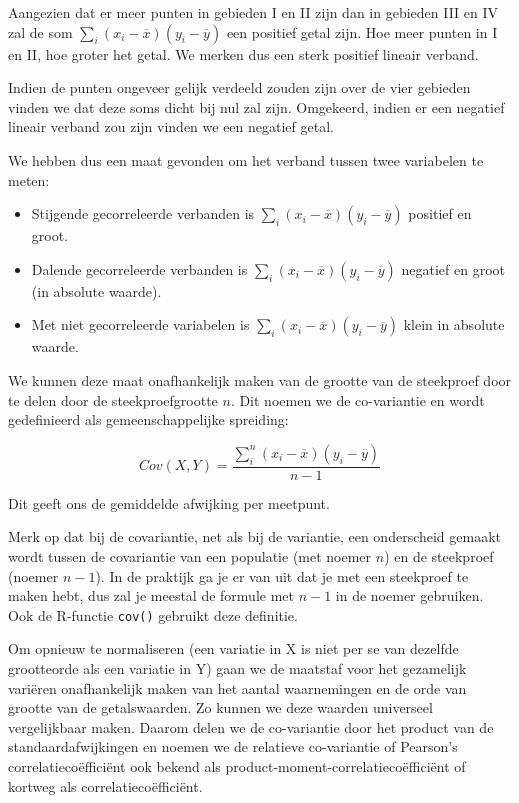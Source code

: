 Aangezien dat er meer punten in gebieden I en II zijn dan in gebieden III en IV zal de som $\sum_{i} (x_{i} - \overline{x}) (y_{i} - \overline{y})$ een positief getal zijn. Hoe meer punten in I en II, hoe groter het getal. We merken dus een sterk positief lineair verband.

Indien de punten ongeveer gelijk verdeeld zouden zijn over de vier gebieden vinden we dat deze soms dicht bij nul zal zijn. Omgekeerd, indien er een negatief lineair verband zou zijn vinden we een negatief getal.

We hebben dus een maat gevonden om het verband tussen twee variabelen te meten:

\begin{itemize}
  \item Stijgende gecorreleerde verbanden is $\sum_{i} (x_{i} - \overline{x}) (y_{i} - \overline{y})$ positief en groot.
  \item Dalende gecorreleerde verbanden is $\sum_{i} (x_{i} - \overline{x}) (y_{i} - \overline{y})$ negatief en groot (in absolute waarde).
  \item Met niet gecorreleerde variabelen is $\sum_{i} (x_{i} - \overline{x}) (y_{i} - \overline{y})$ klein in absolute waarde.
\end{itemize}

We kunnen deze maat onafhankelijk maken van de grootte van de steekproef door te delen door de steekproefgrootte $n$. Dit noemen we de co-variantie en wordt gedefinieerd als gemeenschappelijke spreiding:

\begin{equation}
  Cov(X,Y) = \frac{\sum_{i}^{n}(x_{i} - \overline{x}) (y_{i} - \overline{y})}{n - 1}
  \label{eq:covariantie}
\end{equation}

Dit geeft ons de gemiddelde afwijking per meetpunt.

Merk op dat bij de covariantie, net als bij de variantie, een onderscheid gemaakt wordt tussen de covariantie van een populatie (met noemer $n$) en de steekproef (noemer $n-1$). In de praktijk ga je er van uit dat je met een steekproef te maken hebt, dus zal je meestal de formule met $n-1$ in de noemer gebruiken. Ook de R-functie \texttt{cov()} gebruikt deze definitie.

Om opnieuw te normaliseren (een variatie in X is niet per se van dezelfde grootteorde als een variatie in Y) gaan we de maatstaf voor het gezamelijk vari\"eren onafhankelijk maken van het aantal waarnemingen en de orde van grootte van de getalswaarden. Zo kunnen we deze waarden universeel vergelijkbaar maken. Daarom delen we de co-variantie door het product van de standaardafwijkingen en noemen we de relatieve co-variantie of Pearson's correlatieco\"effici\"ent ook bekend als product-moment-correlatieco\"effici\"ent of kortweg als correlatieco\"effici\"ent.

